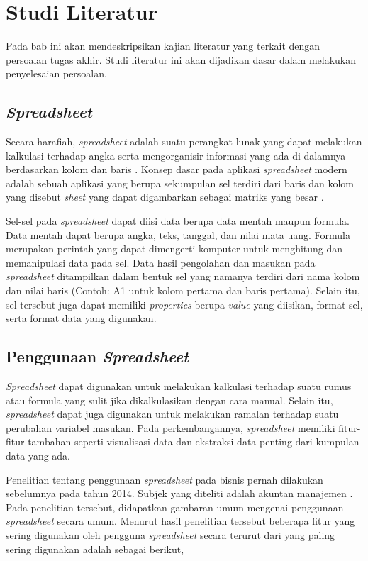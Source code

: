 \chapter{Studi Literatur}

Pada bab ini akan mendeskripsikan kajian literatur yang terkait dengan persoalan tugas akhir. Studi literatur ini akan dijadikan dasar dalam melakukan penyelesaian persoalan.

\section{\textit{Spreadsheet}}
Secara harafiah, \textit{spreadsheet} adalah suatu perangkat lunak yang dapat melakukan kalkulasi terhadap angka serta mengorganisir informasi yang ada di dalamnya berdasarkan kolom dan baris \parencite{meriamwebster-spreadsheet}. Konsep dasar pada aplikasi \textit{spreadsheet} modern adalah sebuah aplikasi yang berupa sekumpulan sel terdiri dari baris dan kolom yang disebut \textit{sheet} yang dapat digambarkan sebagai matriks yang besar \parencite{Ronen1989}.

Sel-sel pada \textit{spreadsheet} dapat diisi data berupa data mentah maupun formula. Data mentah dapat berupa angka, teks, tanggal, dan nilai mata uang. Formula merupakan perintah yang dapat dimengerti komputer untuk menghitung dan memanipulasi data pada sel. Data hasil pengolahan dan masukan pada \textit{spreadsheet} ditampilkan dalam bentuk sel yang namanya terdiri dari nama kolom dan nilai baris (Contoh: A1 untuk kolom pertama dan baris pertama). Selain itu, sel tersebut juga dapat memiliki \textit{properties} berupa \textit{value} yang diisikan, format sel, serta format data yang digunakan.

\section{Penggunaan \textit{Spreadsheet}}
\textit{Spreadsheet} dapat digunakan untuk melakukan kalkulasi terhadap suatu rumus atau formula yang sulit jika dikalkulasikan dengan cara manual. Selain itu, \textit{spreadsheet} dapat juga digunakan untuk melakukan ramalan terhadap suatu perubahan variabel masukan. Pada perkembangannya, \textit{spreadsheet} memiliki fitur-fitur tambahan seperti visualisasi data dan ekstraksi data penting dari kumpulan data yang ada.

Penelitian tentang penggunaan \textit{spreadsheet} pada bisnis pernah dilakukan sebelumnya pada tahun 2014. Subjek yang diteliti adalah akuntan manajemen \parencite{Bradbard2014}. Pada penelitian tersebut, didapatkan gambaran umum mengenai penggunaan \textit{spreadsheet} secara umum. Menurut hasil penelitian tersebut beberapa fitur yang sering digunakan oleh pengguna \textit{spreadsheet} secara terurut dari yang paling sering digunakan adalah sebagai berikut,

